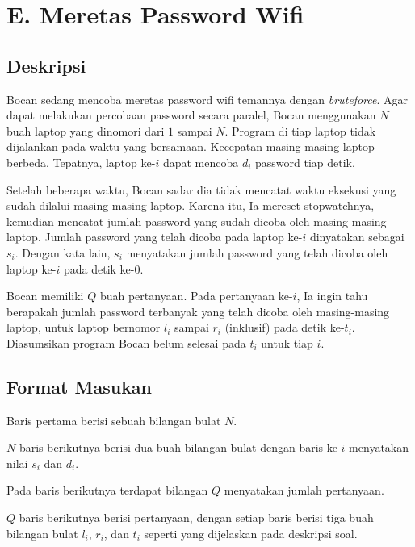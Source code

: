 \documentclass{article}
\begin{document}
\section*{\hfil E. Meretas Password Wifi\hfil}


\subsection*{Deskripsi}

\par\noindent Bocan sedang mencoba meretas password wifi temannya dengan \textit{bruteforce}. Agar dapat melakukan percobaan password secara paralel, Bocan menggunakan $N$ buah laptop yang dinomori dari $1$ sampai $N$. Program di tiap laptop tidak dijalankan pada waktu yang bersamaan. Kecepatan masing-masing laptop berbeda. Tepatnya, laptop ke-$i$ dapat mencoba $d_i$ password tiap detik.

\par\noindent Setelah beberapa waktu, Bocan sadar dia tidak mencatat waktu eksekusi yang sudah dilalui masing-masing laptop. Karena itu, Ia mereset stopwatchnya, kemudian mencatat jumlah password yang sudah dicoba oleh masing-masing laptop. Jumlah password yang telah dicoba pada laptop ke-$i$ dinyatakan sebagai $s_i$. Dengan kata lain, $s_i$ menyatakan jumlah password yang telah dicoba oleh laptop ke-$i$ pada detik ke-$0$. 

\par\noindent Bocan memiliki $Q$ buah pertanyaan. Pada pertanyaan ke-$i$, Ia ingin tahu berapakah jumlah password terbanyak yang telah dicoba oleh masing-masing laptop, untuk laptop bernomor $l_i$ sampai $r_i$ (inklusif) pada detik ke-$t_i$. Diasumsikan program Bocan belum selesai pada $t_i$ untuk tiap $i$.

\subsection*{Format Masukan}

\par\noindent Baris pertama berisi sebuah bilangan bulat $N$.
\par\noindent $N$ baris berikutnya berisi dua buah bilangan bulat dengan baris ke-$i$ menyatakan nilai $s_i$ dan $d_i$.
\par\noindent Pada baris berikutnya terdapat bilangan $Q$ menyatakan jumlah pertanyaan.
\par\noindent $Q$ baris berikutnya berisi pertanyaan, dengan setiap baris berisi tiga buah bilangan bulat $l_i$, $r_i$, dan $t_i$ seperti yang dijelaskan pada deskripsi soal.
\end{document}
